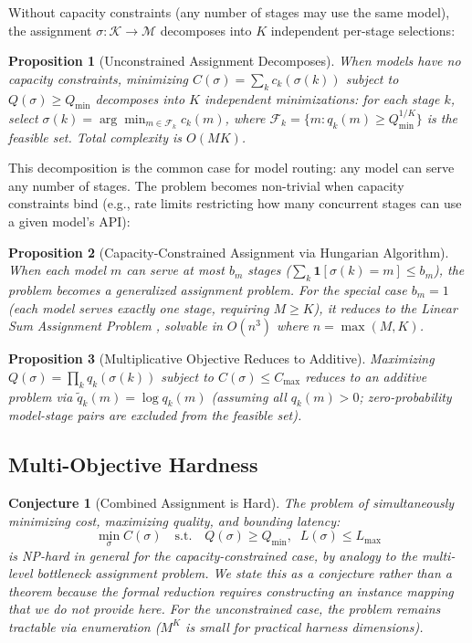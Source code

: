 \documentclass[11pt, a4paper, logo, copyright]{googledeepmind}
\newtheorem{proposition}{Proposition}[section]
\newtheorem{conjecture}{Conjecture}[section]
\begin{document}
Without capacity constraints (any number of stages may use the same model), the assignment $\sigma: \mathcal{K} \to \mathcal{M}$ decomposes into $K$ independent per-stage selections:

\begin{proposition}[Unconstrained Assignment Decomposes]
\label{prop:decompose}
When models have no capacity constraints, minimizing $C(\sigma) = \sum_k c_k(\sigma(k))$ subject to $Q(\sigma) \geq Q_{\min}$ decomposes into $K$ independent minimizations: for each stage $k$, select $\sigma(k) = \arg\min_{m \in \mathcal{F}_k} c_k(m)$, where $\mathcal{F}_k = \{m : q_k(m) \geq Q_{\min}^{1/K}\}$ is the feasible set. Total complexity is $O(MK)$.
\end{proposition}

This decomposition is the common case for model routing: any model can serve any number of stages. The problem becomes non-trivial when capacity constraints bind (e.g., rate limits restricting how many concurrent stages can use a given model's API):

\begin{proposition}[Capacity-Constrained Assignment via Hungarian Algorithm]
\label{prop:hungarian}
When each model $m$ can serve at most $b_m$ stages ($\sum_k \mathbf{1}[\sigma(k) = m] \leq b_m$), the problem becomes a generalized assignment problem. For the special case $b_m = 1$ (each model serves exactly one stage, requiring $M \geq K$), it reduces to the Linear Sum Assignment Problem \citep{kuhn1955, munkres1957}, solvable in $O(n^3)$ where $n = \max(M,K)$.
\end{proposition}

\begin{proposition}[Multiplicative Objective Reduces to Additive]
\label{prop:multiplicative}
Maximizing $Q(\sigma) = \prod_k q_k(\sigma(k))$ subject to $C(\sigma) \leq C_{\max}$ reduces to an additive problem via $\tilde{q}_k(m) = \log q_k(m)$ (assuming all $q_k(m) > 0$; zero-probability model-stage pairs are excluded from the feasible set).
\end{proposition}

\subsection{Multi-Objective Hardness}

\begin{conjecture}[Combined Assignment is Hard]
\label{conj:hard}
The problem of simultaneously minimizing cost, maximizing quality, and bounding latency:
\begin{equation}
\min_{\sigma} C(\sigma) \quad \text{s.t.} \quad Q(\sigma) \geq Q_{\min}, \;\; L(\sigma) \leq L_{\max}
\end{equation}
is NP-hard in general for the capacity-constrained case, by analogy to the multi-level bottleneck assignment problem. We state this as a conjecture rather than a theorem because the formal reduction requires constructing an instance mapping that we do not provide here. For the unconstrained case, the problem remains tractable via enumeration ($M^K$ is small for practical harness dimensions).
\end{conjecture}
\end{document}
